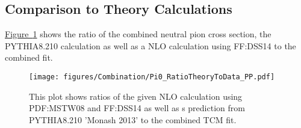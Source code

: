 \subsection{Comparison to Theory Calculations}
 \hyperref[fig:Pi0_Theory]{Figure~\ref*{fig:Pi0_Theory}} shows the ratio of the combined neutral pion cross section, the PYTHIA8.210  calculation as well as a NLO calculation using \acs{FF}:DSS14 to the combined fit.

 		\begin{figure}[h]
 			\centering
 			\texttt{[image: figures/Combination/Pi0\_RatioTheoryToData\_PP.pdf]}
 			\caption{\newline This plot shows ratios of the given NLO calculation using \acs{PDF}:MSTW08 and \acs{FF}:DSS14 as well as s prediction from PYTHIA8.210 'Monash 2013' to the combined \acs{TCM} fit.}
 			\label{fig:Pi0_Theory}
 		\end{figure}

